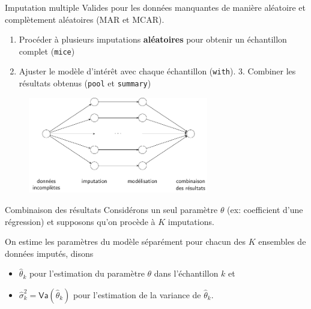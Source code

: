 \documentclass[
  ignorenonframetext,
]{beamer}
\providecommand{\tightlist}{%
  \setlength{\itemsep}{0pt}\setlength{\parskip}{0pt}}\usepackage{longtable,booktabs,array}
\begin{document}
\begin{frame}[fragile]{Imputation multiple}
\protect\hypertarget{imputation-multiple}{}
Valides pour les données manquantes de manière aléatoire et complètement
aléatoires (MAR et MCAR).

\begin{enumerate}
\tightlist
\item
  Procéder à plusieurs imputations \textbf{aléatoires} pour obtenir un
  échantillon complet (\texttt{mice})
\item
  Ajuster le modèle d'intérêt avec chaque échantillon (\texttt{with}).
  3. Combiner les résultats obtenus (\texttt{pool} et \texttt{summary})
\end{enumerate}

\begin{figure}

{\centering \includegraphics[width=0.7\textwidth,height=\textheight]{figures/donnees_manquantes_workflow.pdf}

}

\end{figure}
\end{frame}

\begin{frame}{Combinaison des résultats}
\protect\hypertarget{combinaison-des-ruxe9sultats}{}
Considérons un seul paramètre \(\theta\) (ex: coefficient d'une
régression) et supposons qu'on procède à \(K\) imputations.

On estime les paramètres du modèle séparément pour chacun des \(K\)
ensembles de données imputés, disons

\begin{itemize}
\tightlist
\item
  \(\widehat{\theta}_k\) pour l'estimation du paramètre \(\theta\) dans
  l'échantillon \(k\) et
\item
  \(\widehat{\sigma}_k^2=\mathsf{Va}(\widehat{\theta}_k)\) pour
  l'estimation de la variance de \(\widehat{\theta}_k\).
\end{itemize}
\end{frame}
\end{document}

